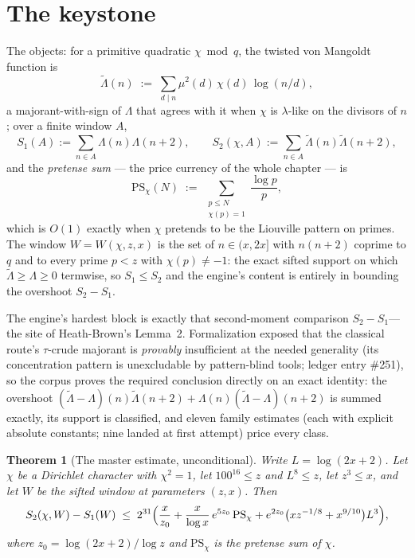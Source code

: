 \documentclass{CUP-JNL-FMP}
\newcommand{\leanname}[1]{\par\noindent{\small\texttt{#1}}}
\newtheorem{theorem}{Theorem}[section]
\theoremstyle{remark}
\begin{document}
\section{The keystone}\label{sec:keystone}

The objects: for a primitive quadratic $\chi \bmod q$, the twisted von
Mangoldt function is
\[
\tilde\Lambda(n) \;:=\; \sum_{d \mid n} \mu^2(d)\,\chi(d)\,\log(n/d),
\]
a majorant-with-sign of $\Lambda$ that agrees with it when $\chi$ is
$\lambda$-like on the divisors of $n$; over a finite window $A$,
\[
S_1(A) := \sum_{n \in A} \Lambda(n)\Lambda(n+2), \qquad
S_2(\chi, A) := \sum_{n \in A} \tilde\Lambda(n)\tilde\Lambda(n+2),
\]
and the \emph{pretense sum} --- the price currency of the whole chapter ---
is
\[
\mathrm{PS}_\chi(N) \;:=\; \sum_{\substack{p \le N \\ \chi(p) = 1}}
\frac{\log p}{p},
\]
which is $O(1)$ exactly when $\chi$ pretends to be the Liouville pattern
on primes. The window $W = W(\chi, z, x)$ is the set of $n \in (x, 2x]$
with $n(n+2)$ coprime to $q$ and to every prime $p < z$ with
$\chi(p) \ne -1$: the exact sifted support on which
$\tilde\Lambda \ge \Lambda \ge 0$ termwise, so $S_1 \le S_2$ and the
engine's content is entirely in bounding the overshoot $S_2 - S_1$.

The engine's hardest block is exactly that second-moment comparison
$S_2 - S_1$---the site of Heath-Brown's \cite{HB1983} Lemma~2. Formalization exposed that the classical route's
$\tau$-crude majorant is \emph{provably} insufficient at the needed
generality (its concentration pattern is unexcludable by pattern-blind
tools; ledger entry \#251), so the corpus proves the required conclusion
directly on an exact identity: the overshoot
$(\tilde\Lambda-\Lambda)(n)\tilde\Lambda(n+2) +
\Lambda(n)(\tilde\Lambda-\Lambda)(n+2)$ is summed exactly, its support is
classified, and eleven family estimates (each with explicit absolute
constants; nine landed at first attempt) price every class.

\begin{theorem}[The master estimate, unconditional]\label{thm:master}
Write $L = \log(2x+2)$. Let $\chi$ be a Dirichlet character with
$\chi^2 = 1$, let $100^{16} \le z$ and $L^8 \le z$, let $z^3 \le x$, and let
$W$ be the sifted window at parameters $(z,x)$. Then
\[
S_2(\chi, W) - S_1(W) \;\le\; 2^{31}\Bigl(\frac{x}{z_0}
+ \frac{x}{\log x}\,e^{5 z_0}\,\mathrm{PS}_\chi
+ e^{2 z_0}\bigl(x z^{-1/8} + x^{9/10}\bigr) L^3\Bigr),
\]
where $z_0 = \log(2x+2)/\log z$ and
$\mathrm{PS}_\chi$ is the pretense sum of $\chi$.
\leanname{Salt.HB.hb\_l2c\_master\_unconditional}
\end{theorem}
\end{document}
